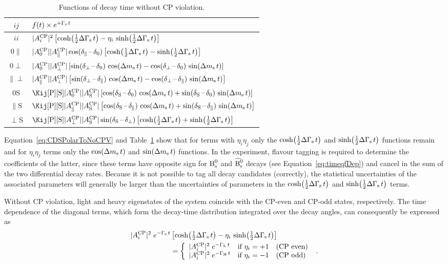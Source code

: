 \begin{table}[htb]
  \centering
  \caption{Functions of decay time without CP violation.}
  \label{tab:timeFunctionsNoCPV}
  \renewcommand{\arraystretch}{1.3}
  \begin{tabular}{cl}
    \hline
    $ij$  &  $f(t) \times e^{+\Gamma_\text{s}\,t}$  \\
    \hline
    $ii$
      &  $|A_{i}^{\text{CP}}|^2 \left[ \cosh\!\left(\tfrac{1}{2}\Delta\Gamma_\text{s}\, t\right) - \eta_i\,\sinh\!\left(\tfrac{1}{2}\Delta\Gamma_\text{s}\, t\right) \right]$  \\
    0$\parallel$
      &  $|A_{\text{0}}^{\text{CP}}||A_{\parallel}^{\text{CP}}|\cos(\delta_{\parallel}\,\text{--}\,\delta_{0}) \left[ \cosh\!\left(\tfrac{1}{2}\Delta\Gamma_\text{s}\, t\right) - \sinh\!\left(\tfrac{1}{2}\Delta\Gamma_\text{s}\, t\right) \right]$  \\
    0$\perp$
      &  $|A_{\text{0}}^{\text{CP}}||A_{\perp}^{\text{CP}}| \left[ \sin(\delta_{\perp}\,\text{--}\,\delta_{0})\,\cos\!\left(\Delta m_\text{s}\, t\right) - \cos(\delta_{\perp}\,\text{--}\,\delta_{0})\,\sin\!\left(\Delta m_\text{s}\, t\right) \right]$  \\
    $\parallel\perp$
      &  $|A_{\parallel}^{\text{CP}}||A_{\perp}^{\text{CP}}| \left[ \sin(\delta_{\perp}\,\text{--}\,\delta_{\parallel})\,\cos\!\left(\Delta m_\text{s}\, t\right) - \cos(\delta_{\perp}\,\text{--}\,\delta_{\parallel})\,\sin\!\left(\Delta m_\text{s}\, t\right) \right]$  \\
    0S
      &  $\CSP\magzeroAv\magSAv[i] \left[ \cos(\delSzero)\,\cDms + \sin(\delSzero)\,\sDms \right]$  \\
    $\parallel$S
      &  $\CSP\magparAv\magSAv \left[ \cos(\delSpar)\,\cDms + \sin(\delSpar)\,\sDms \right]$  \\
    $\perp$S
      &  $\CSP\magperpAv\magSAv\sin(\delSperp) \left[ \cDGs + \sDGs \right]$  \\
    \hline
  \end{tabular}
\end{table}

Equation~\ref{eq:CDSPolarToNoCPV} and Table~\ref{tab:timeFunctionsNoCPV} show that for terms with $\eta_i$\texteq$\eta_j$ only the $\cosh\!\left(\tfrac{1}{2}\Delta\Gamma_\text{s}\, t\right)$
and $\sinh\!\left(\tfrac{1}{2}\Delta\Gamma_\text{s}\, t\right)$ functions remain and for $\eta_i$\texteq\tm$\eta_j$ terms only the $\cos\!\left(\Delta m_\text{s}\, t\right)$ and $\sin\!\left(\Delta m_\text{s}\, t\right)$ functions. In the experiment,
flavour tagging is required to determine the coefficients of the latter, since these terms have opposite sign for $\text{B}_\text{s}^\text{0}$ and $\Bsbar$ decays
(see Equation~\ref{eq:timeqfDep}) and cancel in the sum of the two differential decay rates. Because it is not possible to tag all decay
candidates (correctly), the statistical uncertainties of the associated parameters will generally be larger than the uncertainties of
parameters in the $\cosh\!\left(\tfrac{1}{2}\Delta\Gamma_\text{s}\, t\right)$ and $\sinh\!\left(\tfrac{1}{2}\Delta\Gamma_\text{s}\, t\right)$ terms.

Without CP violation, light and heavy eigenstates of the \BsBsbar{} system coincide with the CP-even and CP-odd states, respectively.
The time dependence of the diagonal terms, which form the decay-time distribution integrated over the decay angles, can consequently be
expressed as
\begin{equation}
  \begin{aligned}
    \label{eq:timeCPEvenOdd}
      |A_{i}^{\text{CP}}|^2\; e^{-\Gamma_\text{s}\,t}&\left[ \cosh\!\left(\tfrac{1}{2}\Delta\Gamma_\text{s}\, t\right) - \eta_i\,\sinh\!\left(\tfrac{1}{2}\Delta\Gamma_\text{s}\, t\right) \right] \\
      &= \left\{\begin{array}{ll}
                  |A_{i}^{\text{CP}}|^2\; e^{-\Gamma_\text{L}\,t}  &  \text{if } \eta_i = +1 \quad\text{(CP even)}  \\
                  |A_{i}^{\text{CP}}|^2\; e^{-\Gamma_\text{H}\,t}  &  \text{if } \eta_i = -1 \quad\text{(CP odd)}
         \end{array}\right.
      \ .
  \end{aligned}
\end{equation}

